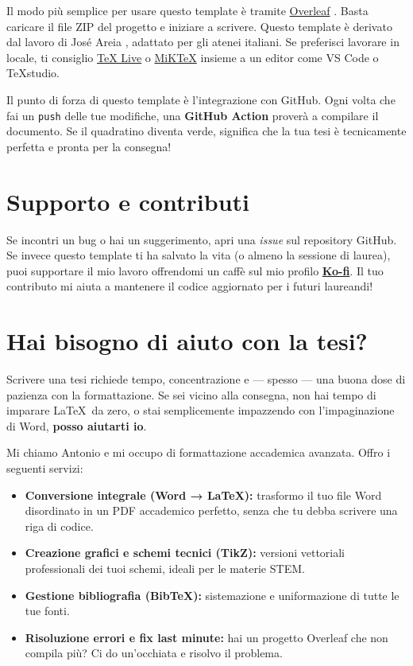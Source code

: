 {	Il modo più semplice per usare questo template è tramite \href{https://www.overleaf.com/}{Overleaf} \citep{Overleaf2024}. Basta caricare il file ZIP del progetto e iniziare a scrivere. Questo template è derivato dal lavoro di José Areia \citep{IPLeiriaThesis}, adattato per gli atenei italiani. Se preferisci lavorare in locale, ti consiglio \href{https://www.tug.org/texlive/}{TeX Live} o \href{https://miktex.org/}{MiKTeX} insieme a un editor come VS Code o TeXstudio.
	
	\begin{block}[tip]
		Il punto di forza di questo template è l'integrazione con GitHub. Ogni volta che fai un \texttt{push} delle tue modifiche, una \textbf{GitHub Action} proverà a compilare il documento. Se il quadratino diventa verde, significa che la tua tesi è tecnicamente perfetta e pronta per la consegna!
	\end{block}
	
	\section{Supporto e contributi}
	Se incontri un bug o hai un suggerimento, apri una \textit{issue} sul repository GitHub. Se invece questo template ti ha salvato la vita (o almeno la sessione di laurea), puoi supportare il mio lavoro offrendomi un caffè sul mio profilo \href{https://ko-fi.com/antoniojosegregoriorega}{\textbf{Ko-fi}}. Il tuo contributo mi aiuta a mantenere il codice aggiornato per i futuri laureandi!
	
	\section{Hai bisogno di aiuto con la tesi?}
	Scrivere una tesi richiede tempo, concentrazione e — spesso — una buona dose di pazienza con la formattazione. Se sei vicino alla consegna, non hai tempo di imparare \LaTeX\ da zero, o stai semplicemente impazzendo con l'impaginazione di Word, \textbf{posso aiutarti io}.
	
	Mi chiamo Antonio e mi occupo di formattazione accademica avanzata. Offro i seguenti servizi:
	
	\begin{itemize}
		\item \textbf{Conversione integrale (Word → \LaTeX):} trasformo il tuo file Word disordinato in un PDF accademico perfetto, senza che tu debba scrivere una riga di codice.
		\item \textbf{Creazione grafici e schemi tecnici (TikZ):} versioni vettoriali professionali dei tuoi schemi, ideali per le materie STEM.
		\item \textbf{Gestione bibliografia (BibTeX):} sistemazione e uniformazione di tutte le tue fonti.
		\item \textbf{Risoluzione errori e fix last minute:} hai un progetto Overleaf che non compila più? Ci do un'occhiata e risolvo il problema.
	\end{itemize}
	
}
